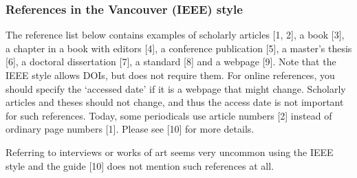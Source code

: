 \documentclass[english, 12pt, a4paper, elec, utf8, a-2b, online]{aaltothesis}
\begin{document}
\subsubsection*{References in the Vancouver (IEEE) style}

The reference list below contains examples of scholarly articles [1, 2], a book 
[3], a chapter in a book with editors [4], a conference publication [5], a 
master’s thesis [6], a doctoral dissertation [7], a standard [8] and a webpage 
[9]. Note that the IEEE style allows DOIs, but does not require them. For online
references, you should specify the ‘accessed date’ if it is a webpage that might
change. Scholarly articles and theses should not change, and thus the access 
date is not important for such references. Today, some periodicals use article 
numbers [2] instead of ordinary page numbers [1]. Please see [10] for more 
details.

Referring to interviews or works of art seems very uncommon using the IEEE style
and the guide [10] does not mention such references at all.
\end{document}
